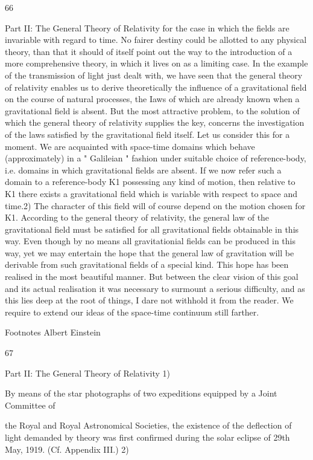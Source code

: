 \documentclass{article}
\begin{document}
66

Part II: The General Theory of Relativity
for the case in which the fields are invariable with regard to time. No fairer destiny could be
allotted to any physical theory, than that it should of itself point out the way to the
introduction of a more comprehensive theory, in which it lives on as a limiting case.
In the example of the transmission of light just dealt with, we have seen that the general
theory of relativity enables us to derive theoretically the influence of a gravitational field on
the course of natural processes, the Iaws of which are already known when a gravitational
field is absent. But the most attractive problem, to the solution of which the general theory
of relativity supplies the key, concerns the investigation of the laws satisfied by the
gravitational field itself. Let us consider this for a moment.
We are acquainted with space-time domains which behave (approximately) in a "
Galileian " fashion under suitable choice of reference-body, i.e. domains in which
gravitational fields are absent. If we now refer such a domain to a reference-body K1
possessing any kind of motion, then relative to K1 there exists a gravitational field which is
variable with respect to space and time.2) The character of this field will of course depend on
the motion chosen for K1. According to the general theory of relativity, the general law of
the gravitational field must be satisfied for all gravitational fields obtainable in this way.
Even though by no means all gravitationial fields can be produced in this way, yet we may
entertain the hope that the general law of gravitation will be derivable from such
gravitational fields of a special kind. This hope has been realised in the most beautiful
manner. But between the clear vision of this goal and its actual realisation it was necessary
to surmount a serious difficulty, and as this lies deep at the root of things, I dare not
withhold it from the reader. We require to extend our ideas of the space-time continuum
still farther.

Footnotes
Albert Einstein

67

Part II: The General Theory of Relativity
1)

By means of the star photographs of two expeditions equipped by a Joint Committee of

the Royal and Royal Astronomical Societies, the existence of the deflection of light
demanded by theory was first confirmed during the solar eclipse of 29th May, 1919. (Cf.
Appendix III.)
2)
\end{document}
